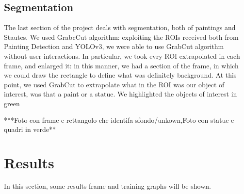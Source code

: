 \documentclass[10pt,twocolumn,letterpaper]{article}
\begin{document}
\subsection{Segmentation}
The last section of the project deals with segmentation, both of paintings and Stautes.
We used GrabcCut algorithm: exploiting the ROIs received both from Painting Detection and YOLOv3, we were able to use GrabCut algorithm without user interactions.
In particular, we took evry ROI extrapolated in each frame, and enlarged it: in this manner, we had a section of the frame, in which we could draw the rectangle to define what was definitely background.
At this point, we used GrabCut to extrapolate what in the ROI was our object of interest, was that a paint or a statue.
We highlighted the objects of interest in green

***Foto con frame e rettangolo che identifa sfondo/unkown,Foto con statue e quadri in verde**
\section{Results}

In this section, some results frame and training graphs will be shown.
\end{document}
